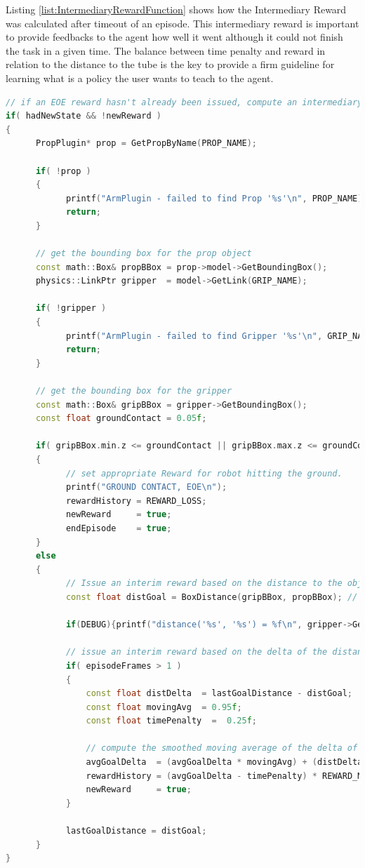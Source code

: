 \documentclass[10pt,journal,compsoc]{IEEEtran}
\begin{document}
Listing \ref{list:IntermediaryRewardFunction} shows how the Intermediary Reward was calculated after timeout of an episode. This intermediary reward is important to provide feedbacks to the agent how well it went although it could not finish the task in a given time. The balance between time penalty and reward in relation to the distance to the tube is the key to provide a firm guideline for learning what is a policy the user wants to teach to the agent.
\begin{lstlisting}[language=C++, caption={Reward Function},label={list:IntermediaryRewardFunction}]
// if an EOE reward hasn't already been issued, compute an intermediary reward
if( hadNewState && !newReward )
{
      PropPlugin* prop = GetPropByName(PROP_NAME);
      
      if( !prop )
      {
            printf("ArmPlugin - failed to find Prop '%s'\n", PROP_NAME);
            return;
      }
      
      // get the bounding box for the prop object
      const math::Box& propBBox = prop->model->GetBoundingBox();
      physics::LinkPtr gripper  = model->GetLink(GRIP_NAME);
      
      if( !gripper )
      {
            printf("ArmPlugin - failed to find Gripper '%s'\n", GRIP_NAME);
            return;
      }
      
      // get the bounding box for the gripper
      const math::Box& gripBBox = gripper->GetBoundingBox();
      const float groundContact = 0.05f;
      
      if( gripBBox.min.z <= groundContact || gripBBox.max.z <= groundContact )
      {
            // set appropriate Reward for robot hitting the ground.
            printf("GROUND CONTACT, EOE\n");
            rewardHistory = REWARD_LOSS;
            newReward     = true;
            endEpisode    = true;
      }
      else
      {
            // Issue an interim reward based on the distance to the object
            const float distGoal = BoxDistance(gripBBox, propBBox); // compute the reward from distance to the goal
            
            if(DEBUG){printf("distance('%s', '%s') = %f\n", gripper->GetName().c_str(), prop->model->GetName().c_str(), distGoal);}
            
            // issue an interim reward based on the delta of the distance to the object
            if( episodeFrames > 1 )
            {
                const float distDelta  = lastGoalDistance - distGoal;
                const float movingAvg  = 0.95f;
                const float timePenalty  =  0.25f;
                
                // compute the smoothed moving average of the delta of the distance to the goal
                avgGoalDelta  = (avgGoalDelta * movingAvg) + (distDelta * (1.0f - movingAvg));
                rewardHistory = (avgGoalDelta - timePenalty) * REWARD_MULTIPLIER;
                newReward     = true;
            }
            
            lastGoalDistance = distGoal;
      }
}
\end{lstlisting}
\end{document}
